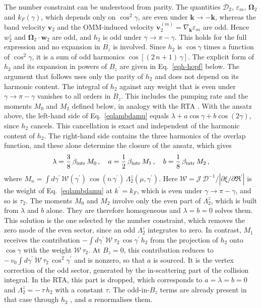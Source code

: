 \documentclass[aps,prb,onecolumn,nofootinbib,citeautoscript,10pt]{revtex4-2}
\newcommand{\bs}[1]{\boldsymbol{#1}}
\begin{document}
The number constraint can be understood from parity. The quantities $\mathcal D_2$, $\varepsilon_m$, $\bs\Omega_2$ and $k_F(\gamma)$, which depends only on $\cos^2\gamma$, are even under $\bs k\to-\bs k$, whereas the band velocity $\bs v_2$ and the OMM-induced velocity $\bs v^{(m)}_2=\nabla_{\bs k}\varepsilon_m$ are odd. Hence $w^z_2$ and $\bs\Omega_2\cdot\bs w_2$ are odd, and $h_2$ is odd under $\gamma\to\pi-\gamma$. This holds for the full expression and no expansion in $B_z$ is involved. Since $h_2$ is $\cos\gamma$ times a function of $\cos^2\gamma$, it is a sum of odd harmonics $\cos[(2\,n+1)\,\gamma]$. The explicit form of $h_2$ and its expansion in powers of $B_z$ are given in Eq.~\eqref{eqh-hopf} below. The argument that follows uses only the parity of $h_2$ and does not depend on its harmonic content. The integral of $h_2$ against any weight that is even under $\gamma\to\pi-\gamma$ vanishes to all orders in $B_z$. This includes the pumping rate and the moments $M_0$ and $M_2$ defined below, in analogy with the RTA \cite{ips-firdous-vnr}. With the ansatz above, the left-hand side of Eq.~\eqref{eqlambdamu} equals $\lambda+a\cos\gamma+b\cos(2\gamma)$, since $h_2$ cancels. This cancellation is exact and independent of the harmonic content of $h_2$. The right-hand side contains the three harmonics of the overlap function, and these alone determine the closure of the ansatz, which gives
\begin{align}
\label{eqharm-bcd}
\lambda=\frac{3}{8}\,\beta_{\rm intr}\,M_0\,, \quad
a=\frac{1}{2}\,\beta_{\rm intr}\,M_1\,, \quad
b=\frac{1}{8}\,\beta_{\rm intr}\,M_2\,,
\end{align}
where $M_n=\int d\gamma^\prime\,\mathcal W(\gamma^\prime)\,\cos(n\,\gamma^\prime)\,\Lambda^z_2(\mu,\gamma^\prime)$. Here $\mathcal W=\mathcal J\,\mathcal D^{-1}/|\partial\xi/\partial\mathfrak{R}^\prime|$ is the weight of Eq.~\eqref{eqlambdamu} at $k^\prime=k_F$, which is even under $\gamma\to\pi-\gamma$, and so is $\tau_2$. The moments $M_0$ and $M_2$ involve only the even part of $\Lambda^z_2$, which is built from $\lambda$ and $b$ alone. They are therefore homogeneous and $\lambda=b=0$ solves them. This solution is the one selected by the number constraint, which removes the zero mode of the even sector, since an odd $\Lambda^z_2$ integrates to zero. In contrast, $M_1$ receives the contribution $-\int d\gamma^\prime\,\mathcal W\,\tau_2\,\cos\gamma^\prime\,h_2$ from the projection of $h_2$ onto $\cos\gamma$ with the weight $\mathcal W\,\tau_2$. At $B_z=0$, this contribution reduces to $-\,v_0\int d\gamma^\prime\,\mathcal W\,\tau_2\,\cos^2\gamma^\prime$ and is nonzero, so that $a$ is sourced. It is the vertex correction of the odd sector, generated by the in-scattering part of the collision integral. In the RTA, this part is dropped, which corresponds to $a=\lambda=b=0$ and $\Lambda^z_2=-\,\tau\,h_2$ with a constant $\tau$. The odd-in-$B_z$ terms are already present in that case through $h_2$ \cite{ips-firdous-vnr}, and $a$ renormalises them.
\end{document}
